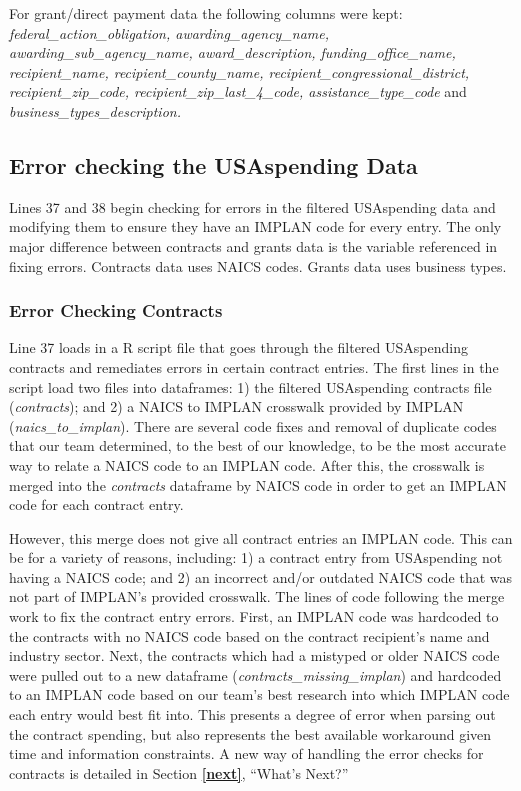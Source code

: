 \documentclass[
]{book}
\begin{document}
For grant/direct payment data the following columns were kept: \emph{federal\_action\_obligation, awarding\_agency\_name, awarding\_sub\_agency\_name, award\_description, funding\_office\_name, recipient\_name, recipient\_county\_name, recipient\_congressional\_district, recipient\_zip\_code, recipient\_zip\_last\_4\_code, assistance\_type\_code} and \emph{business\_types\_description.}

\hypertarget{error-check}{%
\subsection{Error checking the USAspending Data}\label{error-check}}

Lines 37 and 38 begin checking for errors in the filtered USAspending data and modifying them to ensure they have an IMPLAN code for every entry. The only major difference between contracts and grants data is the variable referenced in fixing errors. Contracts data uses NAICS codes. Grants data uses business types.

\hypertarget{error-contracts}{%
\subsubsection{Error Checking Contracts}\label{error-contracts}}

Line 37 loads in a R script file that goes through the filtered USAspending contracts and remediates errors in certain contract entries. The first lines in the script load two files into dataframes: 1) the filtered USAspending contracts file (\emph{contracts}); and 2) a NAICS to IMPLAN crosswalk provided by IMPLAN (\emph{naics\_to\_implan}). There are several code fixes and removal of duplicate codes that our team determined, to the best of our knowledge, to be the most accurate way to relate a NAICS code to an IMPLAN code. After this, the crosswalk is merged into the \emph{contracts} dataframe by NAICS code in order to get an IMPLAN code for each contract entry.

However, this merge does not give all contract entries an IMPLAN code. This can be for a variety of reasons, including: 1) a contract entry from USAspending not having a NAICS code; and 2) an incorrect and/or outdated NAICS code that was not part of IMPLAN's provided crosswalk. The lines of code following the merge work to fix the contract entry errors. First, an IMPLAN code was hardcoded to the contracts with no NAICS code based on the contract recipient's name and industry sector. Next, the contracts which had a mistyped or older NAICS code were pulled out to a new dataframe (\emph{contracts\_missing\_implan}) and hardcoded to an IMPLAN code based on our team's best research into which IMPLAN code each entry would best fit into. This presents a degree of error when parsing out the contract spending, but also represents the best available workaround given time and information constraints. A new way of handling the error checks for contracts is detailed in Section \textbf{\ref{next}}, ``What's Next?''
\end{document}

